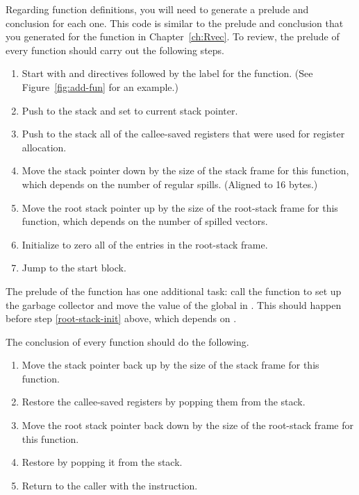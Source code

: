 \documentclass[11pt]{book}
\begin{document}
Regarding function definitions, you will need to generate a prelude
and conclusion for each one. This code is similar to the prelude and
conclusion that you generated for the  function in
Chapter~\ref{ch:Rvec}. To review, the prelude of every function
should carry out the following steps.
\begin{enumerate}
\item Start with  and  directives followed
  by the label for the function.  (See Figure~\ref{fig:add-fun} for an
  example.)
\item Push  to the stack and set  to current stack
  pointer.
\item Push to the stack all of the callee-saved registers that were
  used for register allocation.
\item Move the stack pointer  down by the size of the stack
  frame for this function, which depends on the number of regular
  spills. (Aligned to 16 bytes.)
\item Move the root stack pointer  up by the size of the
  root-stack frame for this function, which depends on the number of
  spilled vectors. \label{root-stack-init}
\item Initialize to zero all of the entries in the root-stack frame.
\item Jump to the start block.
\end{enumerate}
The prelude of the  function has one additional task: call
the  function to set up the garbage collector and
move the value of the global  in
. This should happen before step \ref{root-stack-init}
above, which depends on .

The conclusion of every function should do the following.
\begin{enumerate}
\item Move the stack pointer back up by the size of the stack frame
  for this function.
\item Restore the callee-saved registers by popping them from the
  stack.
\item Move the root stack pointer back down by the size of the
  root-stack frame for this function.
\item Restore  by popping it from the stack.
\item Return to the caller with the  instruction.
\end{enumerate}
\end{document}
